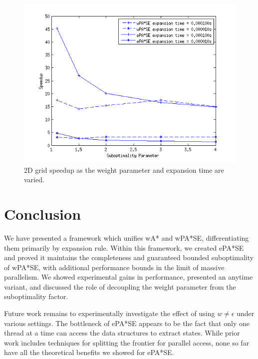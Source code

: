 \documentclass[letterpaper]{article}
\begin{document}
\begin{figure}[fig:tps]
\centering\includegraphics[scale=0.55]{eps_sweep_para.png}
\caption{2D grid speedup as the weight parameter and expansion time are varied.}
\end{figure}

\section{Conclusion}

We have presented a framework which unifies wA* and wPA*SE, differentiating them primarily by expansion rule. Within this framework, we created ePA*SE and proved it maintains the completeness and guaranteed bounded suboptimality of wPA*SE, with additional performance bounds in the limit of massive parallelism. We showed experimental gains in performance, presented an anytime variant, and discussed the role of decoupling the weight parameter from the suboptimality factor.

Future work remains to experimentally investigate the effect of using $w \ne \epsilon$ under various settings. The bottleneck of ePA*SE appears to be the fact that only one thread at a time can access the data structures to extract states. While prior work includes techniques for splitting the frontier for parallel access, none so far have all the theoretical benefits we showed for ePA*SE.



\end{document}
